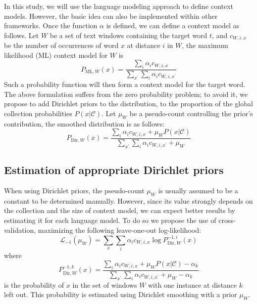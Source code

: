 \documentclass[english]{jnlp_1.4}
\begin{document}
In this study, we will use the language modeling approach to define
context models. However, the basic idea can also be implemented within
other frameworks. Once the function $\alpha$ is defi{}ned, we can
defi{}ne a context model as follows. Let $W$ be a set of text windows
containing the target word $t$, and $c_{W,i,x}$ be the number of
occurrences of word $x$ at distance $i$ in $W$, the maximum likelihood
(ML) context model for $W$ is
\begin{equation}
P_{\mathrm{ML},W}(x)=\frac{\sum_{i}\alpha_{i}c_{W,i,x}}{\sum_{x^{\prime}}\sum_{i}\alpha_{i}c_{W,i,x^{\prime}}}
\label{eq:MakeML}
\end{equation}
Such a probability function will then form a context model for the
target word. The above formulation suffers from the zero probability
problem; to avoid it, we propose to add Dirichlet priors to the distribution,
to the proportion of the global collection probabilities $P(x|\mathcal{C})$.
Let $\mu_{W}$ be a pseudo-count controlling the prior's contribution,
the smoothed distribution is as follows:
\begin{equation}
P_{\mathrm{Dir},W}(x)=\frac{\sum_{i}\alpha_{i}c_{W,i,x}+\mu_{W}P(x|\mathcal{C})}{\sum_{x^{\prime}}\sum_{i}\alpha_{i}c_{W,i,x^{\prime}}+\mu_{W}}
\label{eq:MakeDir}
\end{equation}


\subsection{Estimation of appropriate Dirichlet priors}
\label{sub:Estimation-Dir-prior}

When using Dirichlet priors, the pseudo-count $\mu_{W}$ is usually
assumed to be a constant to be determined manually. However, since
its value strongly depends on the collection and the size of context
model, we can expect better results by estimating it for each language
model. To do so we propose the use of cross-validation, maximizing
the following leave-one-out log-likelihood:
\begin{equation}
\mathcal{L}_{-1}(\mu_{W})=\sum_{x}\sum_{i}\alpha_{i}c_{W,i,x}\log P_{\mathrm{Dir},W}^{-1,i}(x)\label{eq:leave-one-out-ll}\end{equation}
where
\[
P_{\mathrm{Dir},W}^{-1,k}(x)=\frac{\sum_{i}\alpha_{i}c_{W,i,x}+\mu_{W}P(x|\mathcal{C})-\alpha_{k}}{\sum_{x^{\prime}}\sum_{i}\alpha_{i}c_{W,i,x^{\prime}}+\mu_{W}-\alpha_{k}}
\]
is the probability of $x$ in the set of windows $W$ with one instance
at distance $k$ left out. This probability is estimated using Dirichlet
smoothing with a prior $\mu_{W}$.
\end{document}

